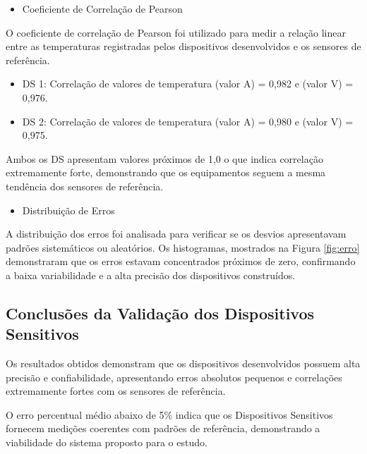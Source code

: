 	\begin{itemize}	
		\item Coeficiente de Correlação de Pearson
		\end{itemize}

		O coeficiente de correlação de Pearson foi utilizado para medir a relação linear 
		entre as temperaturas registradas pelos dispositivos desenvolvidos e os sensores de referência.
		
		\begin{itemize}
			\item \acrshort{DS} 1: Correlação de valores de temperatura (valor A) = 0,982 e (valor V) = 0,976.
			\item \acrshort{DS} 2: Correlação de valores de temperatura (valor A) = 0,980 e (valor V) = 0,975.
		\end{itemize}
		
		Ambos os \acrshort{DS} apresentam valores próximos de 1,0 o que indica correlação 
		extremamente forte, demonstrando que os equipamentos seguem a mesma tendência dos sensores de 
		referência.

	\begin{itemize}	
		\item Distribuição de Erros
	\end{itemize}
	
		A distribuição dos erros foi analisada para verificar se os desvios apresentavam padrões 
		sistemáticos ou aleatórios. Os histogramas, mostrados na Figura \ref{fig:erro} 
		demonstraram que os erros estavam concentrados próximos de zero, confirmando a baixa variabilidade e a alta precisão dos dispositivos construídos.


	

\subsection{Conclusões da Validação dos Dispositivos Sensitivos}
	Os resultados obtidos demonstram que os dispositivos desenvolvidos possuem alta precisão e confiabilidade, apresentando erros absolutos pequenos e correlações extremamente fortes com os sensores de referência. 
    
    O erro percentual médio abaixo de 5\% indica que os Dispositivos Sensitivos fornecem medições coerentes com padrões de referência, demonstrando a viabilidade do sistema proposto para o estudo.